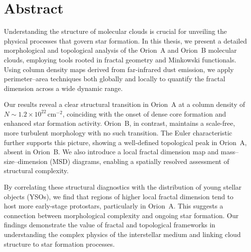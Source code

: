 \chapter{Abstract}

Understanding the structure of molecular clouds is crucial for unveiling the physical processes that govern star formation. 
In this thesis, we present a detailed morphological and topological analysis of the Orion~A and Orion~B molecular clouds, employing tools rooted in fractal geometry and Minkowski functionals. 
Using column density maps derived from far-infrared dust emission, we apply perimeter–area techniques both globally and locally to quantify the fractal dimension across a wide dynamic range. 

Our results reveal a clear structural transition in Orion~A at a column density of $N \sim 1.2 \times 10^{22} \,\mathrm{cm}^{-2}$, coinciding with the onset of dense core formation and enhanced star formation activity. 
Orion~B, in contrast, maintains a scale-free, more turbulent morphology with no such transition. 
The Euler characteristic further supports this picture, showing a well-defined topological peak in Orion~A, absent in Orion~B. We also introduce a local fractal dimension map and mass–size–dimension (MSD) diagrams, enabling a spatially resolved assessment of structural complexity.

By correlating these structural diagnostics with the distribution of young stellar objects (YSOs), we find that regions of higher local fractal dimension tend to host more early-stage protostars, particularly in Orion~A. 
This suggests a connection between morphological complexity and ongoing star formation. 
Our findings demonstrate the value of fractal and topological frameworks in understanding the complex physics of the interstellar medium and linking cloud structure to star formation processes.
